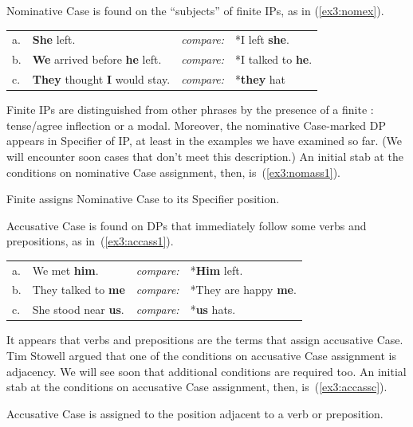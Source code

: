 Nominative Case is found on the ``subjects'' of finite IPs, as in (\ref{ex3:nomex}).
\begin{exe}
\ex \label{ex3:nomex} 
\begin{tabular}{llll}
a. & \textbf{She} left. & \emph{compare:} & *I left \textbf{she}.\\
b. & \textbf{We} arrived before \textbf{he} left. & \emph{compare:} & *I talked to \textbf{he}.\\
c. & \textbf{They} thought \textbf{I} would stay. & \emph{compare:} & *\textbf{they} hat
\end{tabular}
\end{exe}
Finite IPs are distinguished from other phrases by the presence of a finite : tense/agree inflection or a modal. Moreover, the nominative Case-marked DP appears in Specifier of IP, at least in the examples we have examined so far. (We will encounter soon cases that don't meet this description.) An initial stab at the conditions on nominative Case assignment, then, is~(\ref{ex3:nomass1}).
\begin{exe}
\ex \label{ex3:nomass1} Finite  assigns Nominative Case to its Specifier position.
\end{exe}

Accusative Case is found on DPs that immediately follow some verbs and prepositions, as in~(\ref{ex3:accass1}).
\begin{exe}
\ex \label{ex3:accass1} 
\begin{tabular}{llll}
a. & We met \textbf{him}. & \emph{compare:} & *\textbf{Him} left.\\
b. & They talked to \textbf{me} & \emph{compare:} & *They are happy \textbf{me}.\\
c. & She stood near \textbf{us}. & \emph{compare:} & *\textbf{us} hats.
\end{tabular}
\end{exe}
It appears that verbs and prepositions are the terms that assign accusative Case. Tim Stowell argued that one of the conditions on accusative Case assignment is adjacency. We will see soon that additional conditions are required too. An initial stab at the conditions on accusative Case assignment, then, is~(\ref{ex3:accassc}).
\begin{exe}
\ex \label{ex3:accassc} Accusative Case is assigned to the position adjacent to a verb or preposition.
\end{exe}

